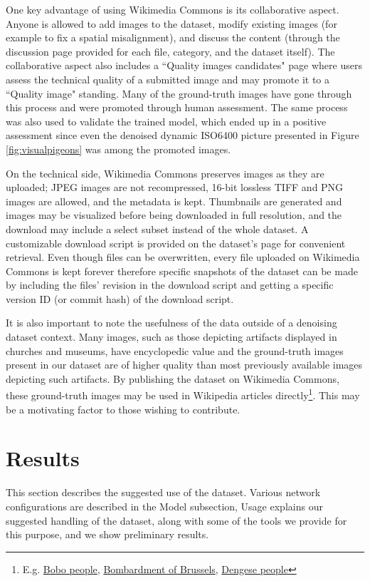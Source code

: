 \documentclass[10pt,twocolumn,letterpaper]{article}
\begin{document}
One key advantage of using Wikimedia Commons is its collaborative aspect. Anyone is allowed to add images to the dataset, modify existing images (for example to fix a spatial misalignment), and discuss the content (through the discussion page provided for each file, category, and the dataset itself). The collaborative aspect also includes a ``Quality images candidates" page \cite{qic} where users assess the technical quality of a submitted image and may promote it to a ``Quality image" standing. Many of the ground-truth images have gone through this process and were promoted through human assessment. The same process was also used to validate the trained model, which ended up in a positive assessment since even the denoised dynamic ISO6400 picture presented in Figure \ref{fig:visualpigeons} was among the promoted images.

On the technical side, Wikimedia Commons preserves images as they are uploaded; JPEG images are not recompressed, 16-bit lossless TIFF and PNG images are allowed, and the metadata is kept. Thumbnails are generated and images may be visualized before being downloaded in full resolution, and the download may include a select subset instead of the whole dataset. A customizable download script is provided on the dataset's page for convenient retrieval. Even though files can be overwritten, every file uploaded on Wikimedia Commons is kept forever therefore specific snapshots of the dataset can be made by including the files' revision in the download script and getting a specific version ID (or commit hash) of the download script.

It is also important to note the usefulness of the data outside of a denoising dataset context. Many images, such as those depicting artifacts displayed in churches and museums, have encyclopedic value and the ground-truth images present in our dataset are of higher quality than most previously available images depicting such artifacts. By publishing the dataset on Wikimedia Commons, these ground-truth images may be used in Wikipedia articles directly\footnote{E.g. \href{https://en.wikipedia.org/wiki/Bobo_people}{Bobo people}, \href{https://en.wikipedia.org/wiki/Bombardment_of_Brussels}{Bombardment of Brussels}, \href{https://en.wikipedia.org/wiki/Dengese_people}{Dengese people}}. This may be a motivating factor to those wishing to contribute.
\section{Results}
This section describes the suggested use of the dataset. Various network configurations are described in the Model subsection, Usage explains our suggested handling of the dataset, along with some of the tools we provide for this purpose, and we show preliminary results.
\end{document}
